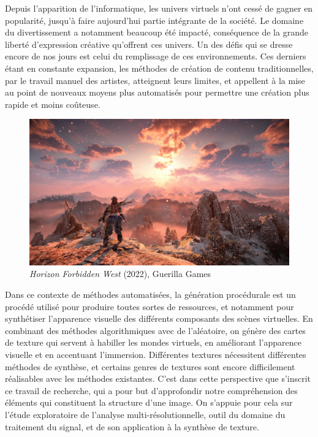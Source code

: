 \Introduction

Depuis l'apparition de l'informatique, les univers virtuels n'ont cessé de gagner en popularité, jusqu'à faire aujourd'hui partie intégrante de la société. Le domaine du divertissement a notamment beaucoup été impacté, conséquence de la grande liberté d'expression créative qu'offrent ces univers. Un des défis qui se dresse encore de nos jours est celui du remplissage de ces environnements. Ces derniers étant en constante expansion, les méthodes de création de contenu traditionnelles, par le travail manuel des artistes, atteignent leurs limites, et appellent à la mise au point de nouveaux moyens plus automatisés pour permettre une création plus rapide et moins coûteuse. 

\begin{figure}[!h]
    \centering
    \includegraphics[width=.75\textwidth]{contenu/resources/images/Horizon-Forbidden-West}
    \caption{{\it Horizon Forbidden West} (2022), Guerilla Games}
    \label{fig:horizon}
\end{figure}

Dans ce contexte de méthodes automatisées, la génération procédurale est un procédé utilisé pour produire toutes sortes de ressources, et notamment pour synthétiser l'apparence visuelle des différents composants des scènes virtuelles. En combinant des méthodes algorithmiques avec de l'aléatoire, on génère des cartes de texture qui servent à habiller les mondes virtuels, en améliorant l'apparence visuelle et en accentuant l'immersion. Différentes textures nécessitent différentes méthodes de synthèse, et certains genres de textures sont encore difficilement réalisables avec les méthodes existantes. C'est dans cette perspective que s'inscrit ce travail de recherche, qui a pour but d'approfondir notre compréhension des éléments qui constituent la structure d'une image. On s'appuie pour cela sur l'étude exploratoire de l'analyse multi-résolutionnelle, outil du domaine du traitement du signal, et de son application à la synthèse de texture.

